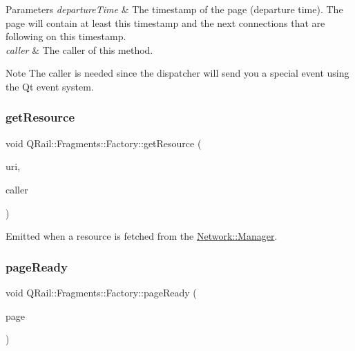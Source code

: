 \begin{DoxyParams}{Parameters}
{\em departure\+Time} & The timestamp of the page (departure time). The page will contain at least this timestamp and the next connections that are following on this timestamp. \\
\hline
{\em caller} & The caller of this method. \\
\hline
\end{DoxyParams}
\begin{DoxyNote}{Note}
The caller is needed since the dispatcher will send you a special event using the Qt event system. 
\end{DoxyNote}
\mbox{\label{classQRail_1_1Fragments_1_1Factory_aea317c8efb3b0edfcd937935293b5988}} 
\subsubsection{\texorpdfstring{getResource}{getResource}}
{\footnotesize\ttfamily void Q\+Rail\+::\+Fragments\+::\+Factory\+::get\+Resource (\begin{DoxyParamCaption}\item[{const Q\+Url \&}]{uri,  }\item[{Q\+Object $\ast$}]{caller }\end{DoxyParamCaption})\hspace{0.3cm}{\ttfamily [signal]}}



Emitted when a resource is fetched from the \mbox{\hyperlink{classQRail_1_1Network_1_1Manager}{Network\+::\+Manager}}. 

\mbox{\label{classQRail_1_1Fragments_1_1Factory_a1ba7147390ac01a41fd82412468d64fa}} 
\subsubsection{\texorpdfstring{pageReady}{pageReady}}
{\footnotesize\ttfamily void Q\+Rail\+::\+Fragments\+::\+Factory\+::page\+Ready (\begin{DoxyParamCaption}\item[{\mbox{\hyperlink{classQRail_1_1Fragments_1_1Page}{Q\+Rail\+::\+Fragments\+::\+Page}} $\ast$}]{page }\end{DoxyParamCaption})\hspace{0.3cm}{\ttfamily [signal]}}



